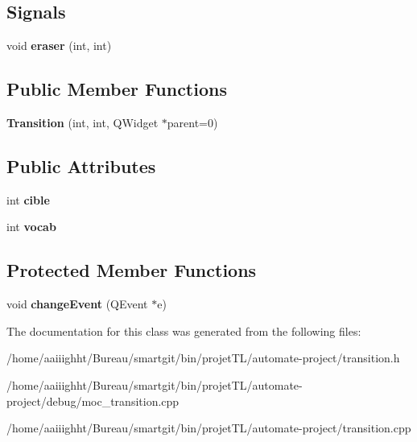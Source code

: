 \subsection*{Signals}
\begin{DoxyCompactItemize}
\item 
\hypertarget{class_transition_abbd3e6ff526c19cd4ebc629d1be10200}{void {\bfseries eraser} (int, int)}\label{class_transition_abbd3e6ff526c19cd4ebc629d1be10200}

\end{DoxyCompactItemize}
\subsection*{Public Member Functions}
\begin{DoxyCompactItemize}
\item 
\hypertarget{class_transition_a42b17d24af24110d405ce53c1956cc2e}{{\bfseries Transition} (int, int, Q\-Widget $\ast$parent=0)}\label{class_transition_a42b17d24af24110d405ce53c1956cc2e}

\end{DoxyCompactItemize}
\subsection*{Public Attributes}
\begin{DoxyCompactItemize}
\item 
\hypertarget{class_transition_a1b3f80305749c8f032a7f711527b0fc3}{int {\bfseries cible}}\label{class_transition_a1b3f80305749c8f032a7f711527b0fc3}

\item 
\hypertarget{class_transition_a209c68fd432cd8e763342c1f2c784a87}{int {\bfseries vocab}}\label{class_transition_a209c68fd432cd8e763342c1f2c784a87}

\end{DoxyCompactItemize}
\subsection*{Protected Member Functions}
\begin{DoxyCompactItemize}
\item 
\hypertarget{class_transition_a9df49098a20b28bd720e96d69255a026}{void {\bfseries change\-Event} (Q\-Event $\ast$e)}\label{class_transition_a9df49098a20b28bd720e96d69255a026}

\end{DoxyCompactItemize}


The documentation for this class was generated from the following files\-:\begin{DoxyCompactItemize}
\item 
/home/aaiiighht/\-Bureau/smartgit/bin/projet\-T\-L/automate-\/project/transition.\-h\item 
/home/aaiiighht/\-Bureau/smartgit/bin/projet\-T\-L/automate-\/project/debug/moc\-\_\-transition.\-cpp\item 
/home/aaiiighht/\-Bureau/smartgit/bin/projet\-T\-L/automate-\/project/transition.\-cpp\end{DoxyCompactItemize}
